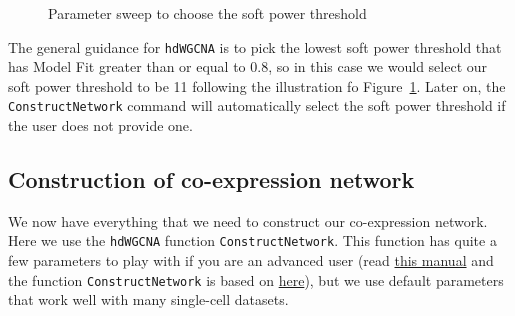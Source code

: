 \documentclass[
  letterpaper,
  DIV=11,
  numbers=noendperiod]{scrartcl}
\begin{document}
\begin{figure}[H]


\caption{\label{fig-sweep}Parameter sweep to choose the soft power
threshold}

\end{figure}%

The general guidance for \texttt{hdWGCNA} is to pick the lowest soft
power threshold that has Model Fit greater than or equal to 0.8, so in
this case we would select our soft power threshold to be 11 following
the illustration fo Figure~\ref{fig-sweep}. Later on, the
\texttt{ConstructNetwork} command will automatically select the soft
power threshold if the user does not provide one.

\subsection{Construction of co-expression
network}\label{construction-of-co-expression-network}

We now have everything that we need to construct our co-expression
network. Here we use the \texttt{hdWGCNA} function
\texttt{ConstructNetwork}. This function has quite a few parameters to
play with if you are an advanced user (read
\href{https://rdrr.io/github/smorabit/hdWGCNA/man/ConstructNetwork.html}{this
manual} and the function \texttt{ConstructNetwork} is based on
\href{https://www.rdocumentation.org/packages/WGCNA/versions/1.72-5/topics/blockwiseConsensusModules}{here}),
but we use default parameters that work well with many single-cell
datasets.
\end{document}
